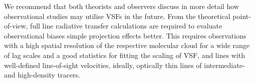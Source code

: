 We recommend that both theorists and observers discuss in more detail how observational studies may utilise VSFs in the future.
From the theoretical point-of-view, full line radiative transfer calculations are required to evaluate observational biases simple projection effects better.
This requires observations with a high spatial resolution of the respective molecular cloud for a wide range of lag scales and a good statistics for fitting the scaling of VSF, and lines with well-defined line-of-sight velocities, ideally, optically thin lines of intermediate- and high-density tracers. 










